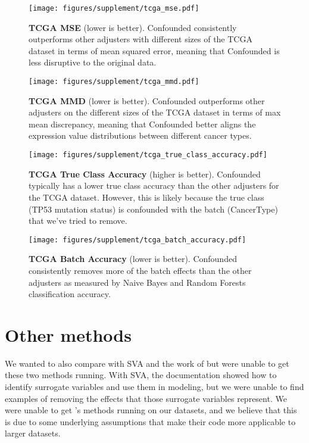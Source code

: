\documentclass{article}
\begin{document}
\begin{figure}
	\centering
	\texttt{[image: figures/supplement/tcga\_mse.pdf]}
	\caption{\textbf{TCGA MSE} (lower is better).
	Confounded consistently outperforms other adjusters with different sizes of the TCGA dataset in terms of mean squared error, meaning that Confounded is less disruptive to the original data.
	\disclaimer{}
	}
	\label{fig:mse}
\end{figure}
\begin{figure}
	\centering
	\texttt{[image: figures/supplement/tcga\_mmd.pdf]}
	\caption{\textbf{TCGA MMD} (lower is better).
	Confounded outperforms other adjusters on the different sizes of the TCGA dataset in terms of max mean discrepancy, meaning that Confounded better aligns the expression value distributions between different cancer types.
	\disclaimer{}
	}
	\label{fig:mmd}
\end{figure}
\begin{figure}
	\centering
	\texttt{[image: figures/supplement/tcga\_true\_class\_accuracy.pdf]}
	\caption{\textbf{TCGA True Class Accuracy} (higher is better).
	Confounded typically has a lower true class accuracy than the other adjusters for the TCGA dataset.
	However, this is likely because the true class (TP53 mutation status) is confounded with the batch (CancerType) that we've tried to remove.
	\disclaimer{}
	}
	\label{fig:true_class}
\end{figure}
\begin{figure}
	\centering
	\texttt{[image: figures/supplement/tcga\_batch\_accuracy.pdf]}
	\caption{\textbf{TCGA Batch Accuracy} (lower is better).
	Confounded consistently removes more of the batch effects than the other adjusters as measured by Naive Bayes and Random Forests classification accuracy.
	\disclaimer{}
	}
	\label{fig:batch}
\end{figure}

\section{Other methods}

We wanted to also compare with SVA \cite{leek_capturing_2007} and the work of \citet{shaham_removal_2017} \citep{shaham_removal_2017,shaham_batch_2018} but were unable to get these two methods running.
With SVA, the documentation showed how to identify surrogate variables and use them in modeling, but we were unable to find examples of removing the effects that those surrogate variables represent.
We were unable to get \citet{shaham_removal_2017}'s methods running on our datasets, and we believe that this is due to some underlying assumptions that make their code more applicable to larger datasets.
\end{document}

